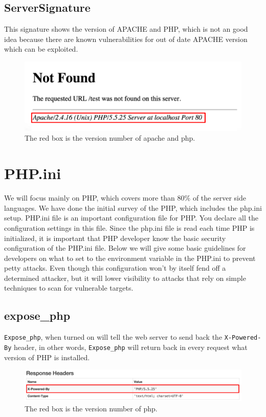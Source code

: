 \documentclass[conference]{IEEEtran}
\begin{document}
\subsection{ServerSignature}
This signature shows the version of APACHE and PHP, which is not an good idea because there are known vulnerabilities for out of date APACHE version which can be exploited.
\begin{figure}[h]
\includegraphics[scale=0.3]{serversignature}
\centering
\caption{The red box is the version number of apache and php.}
\end{figure}


\section{PHP.ini}
We will focus mainly on PHP, which covers more than $80\%$ \cite{PHPusuage} of the server side languages. We have done the initial
survey of the PHP, which includes the php.ini setup.
PHP.ini file is an important configuration file for PHP. You declare all the configuration settings in this file. Since the php.ini file is read each time PHP is initialized, it is important that
PHP developer know the basic security configuration of the PHP.ini file. Below we will give some basic guidelines for developers on what to set to the environment variable in the PHP.ini
to prevent petty attacks. Even though this configuration won't by itself fend off a determined attacker, but it will lower visibility to attacks that rely on simple techniques to scan for vulnerable targets\cite{phpini}.
 
\subsection{expose\_php}
\texttt{Expose\_php}, when turned on will tell the web server to send back the \texttt{X-Powered-By} header, in other words, \texttt{Expose\_php} will return back in every request what version of PHP is installed.

\begin{figure}[h]
\includegraphics[scale=0.5]{exposephp}
\centering
\caption{The red box is the version number of php.}
\end{figure}
\end{document}
